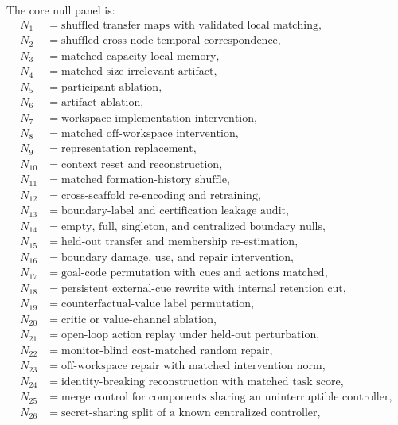 \documentclass[11pt,letterpaper]{article}
\theoremstyle{plain}
\theoremstyle{definition}
\begin{document}
The core null panel is:
\[
\begin{aligned}
N_1&=\text{shuffled transfer maps with validated local matching},\\
N_2&=\text{shuffled cross-node temporal correspondence},\\
N_3&=\text{matched-capacity local memory},\\
N_4&=\text{matched-size irrelevant artifact},\\
N_5&=\text{participant ablation},\\
N_6&=\text{artifact ablation},\\
N_7&=\text{workspace implementation intervention},\\
N_8&=\text{matched off-workspace intervention},\\
N_9&=\text{representation replacement},\\
N_{10}&=\text{context reset and reconstruction},\\
N_{11}&=\text{matched formation-history shuffle},\\
N_{12}&=\text{cross-scaffold re-encoding and retraining},\\
N_{13}&=\text{boundary-label and certification leakage audit},\\
N_{14}&=\text{empty, full, singleton, and centralized boundary nulls},\\
N_{15}&=\text{held-out transfer and membership re-estimation},\\
N_{16}&=\text{boundary damage, use, and repair intervention},\\
N_{17}&=\text{goal-code permutation with cues and actions matched},\\
N_{18}&=\text{persistent external-cue rewrite with internal retention cut},\\
N_{19}&=\text{counterfactual-value label permutation},\\
N_{20}&=\text{critic or value-channel ablation},\\
N_{21}&=\text{open-loop action replay under held-out perturbation},\\
N_{22}&=\text{monitor-blind cost-matched random repair},\\
N_{23}&=\text{off-workspace repair with matched intervention norm},\\
N_{24}&=\text{identity-breaking reconstruction with matched task score},\\
N_{25}&=\text{merge control for components sharing an uninterruptible controller},\\
N_{26}&=\text{secret-sharing split of a known centralized controller},\\

\end{aligned}\]
\end{document}
